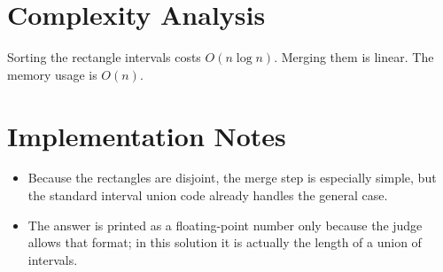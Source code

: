 \documentclass[11pt]{article}
\begin{document}
\section*{Complexity Analysis}

Sorting the rectangle intervals costs $O(n \log n)$. Merging them is linear. The memory usage is $O(n)$.

\section*{Implementation Notes}

\begin{itemize}[leftmargin=*]
    \item Because the rectangles are disjoint, the merge step is especially simple, but the standard interval
    union code already handles the general case.
    \item The answer is printed as a floating-point number only because the judge allows that format; in this
    solution it is actually the length of a union of intervals.
\end{itemize}
\end{document}
